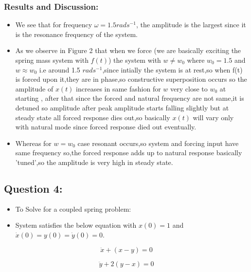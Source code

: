\documentclass[11pt, a4paper]{article}
\begin{document}
  \subsubsection{Results and Discussion:}\label{results-and-discussion}
\begin{itemize}
\item
We see that for frequency $\omega = 1.5 rads^{-1}$, the amplitude is the largest since it is the resonance frequency of the system.
\item
  As we observe in Figure 2 that when we force (we are basically exciting
  the spring mass system with \(f(t)\)) the system with \(w \neq w_0\)
  where \(w_0 = 1.5\) and \(w \approx w_0\) i.e around 1.5
  \(rads^{-1}\),since intially the system is at rest,so when f(t) is
  forced upon it,they are in phase,so constructive superposition occurs
  so the amplitude of \(x(t)\) increases in same fashion for \(w\) very
  close to \(w_0\) at starting , after that since the forced and natural
  frequency are not same,it is detuned so amplitude after peak amplitude
  starts falling slightly but at steady state all forced response dies
  out,so basically \(x(t)\) will vary only with natural mode since
  forced response died out eventually.
\item
  Whereas for \(w=w_0\) case resonant occurs,so system and forcing input
  have same frequency so,the forced response adds up to natural response
  basically 'tuned',so the amplitude is very high in steady state.
\end{itemize}
\newpage
    \subsection{Question 4:}\label{question-4}

\begin{itemize}
\item
  To Solve for a coupled spring problem:
\item
  System satisfies the below equation with \(x(0) = 1\) and
  \(\dot x(0) = y(0) = \dot y(0) = 0\).
\end{itemize}

\begin{equation}
\ddot x + (x-y) = 0
\end{equation}

\begin{equation}
\ddot y + 2(y-x)= 0
\end{equation}
\end{document}
